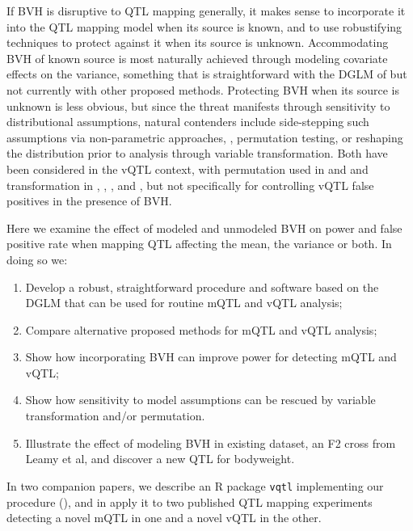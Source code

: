 If BVH is disruptive to QTL mapping generally, it makes sense to incorporate it into the QTL mapping model when its source is known, and to use robustifying techniques to protect against it when its source is unknown.
Accommodating BVH of known source is most naturally achieved through modeling covariate effects on the variance, something that is straightforward with the DGLM of \cite{Ronnegard2011a} but not currently with other proposed methods. 
Protecting BVH when its source is unknown is less obvious, but since the threat manifests through sensitivity to distributional assumptions, natural contenders include side-stepping such assumptions via non-parametric approaches, \eg, permutation testing, or reshaping the distribution prior to analysis through variable transformation.
Both have been considered in the vQTL context, with permutation used in \cite{Hulse2013} and \cite{Yang2012} and transformation in \cite{Ronnegard2011a}, \cite{Yang2012}, \cite{Sun2013a}, and \cite{Shen2013a}, but not specifically for controlling vQTL false positives in the presence of BVH.

Here we examine the effect of modeled and unmodeled BVH on power and false positive rate when mapping QTL affecting the mean, the variance or both.
In doing so we:
\begin{enumerate}
\item Develop a robust, straightforward procedure and software based on the DGLM that can be used for routine mQTL and vQTL analysis;
\item Compare alternative proposed methods for mQTL and vQTL analysis;
\item Show how incorporating BVH can improve power for detecting mQTL and vQTL;
\item Show how sensitivity to model assumptions can be rescued by variable transformation and/or permutation. 
\item Illustrate the effect of modeling BVH in existing dataset, an F2 cross from Leamy et al, and discover a new QTL for bodyweight.
\end{enumerate}
In two companion papers, we describe an R package \texttt{vqtl} implementing our procedure (\CortyRPaper), and in \CortyReanalysisPaper apply it to two published QTL mapping experiments detecting a novel mQTL in one and a novel vQTL in the other.


